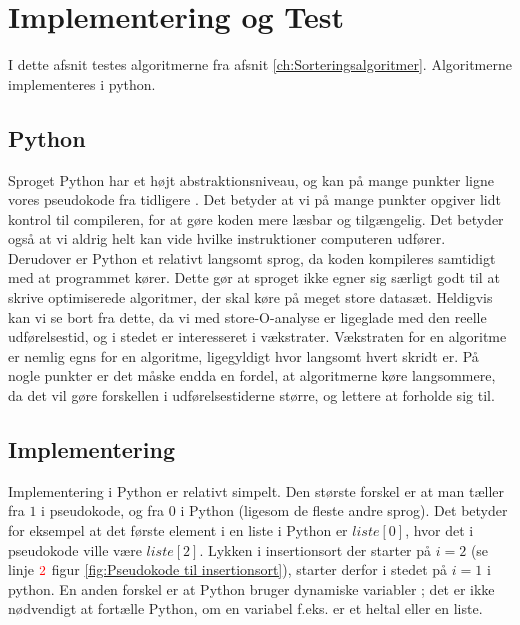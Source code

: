 \chapter{Implementering og Test}
\label{ch:Implementering og test af Algoritmerne}

I dette afsnit testes algoritmerne fra afsnit \ref{ch:Sorteringsalgoritmer}. Algoritmerne implementeres i python.

\section{Python}
\label{sec:Python}

Sproget Python har et højt abstraktionsniveau, og kan på mange punkter ligne vores pseudokode fra tidligere \cite[s. 68]{aogd}. Det betyder at vi på mange punkter opgiver lidt kontrol til compileren, for at gøre koden mere læsbar og tilgængelig. Det betyder også at vi aldrig helt kan vide hvilke instruktioner computeren udfører. Derudover er Python et relativt langsomt sprog, da koden kompileres samtidigt med at programmet kører. Dette gør at sproget ikke egner sig særligt godt til at skrive optimiserede algoritmer, der skal køre på meget store datasæt. Heldigvis kan vi se bort fra dette, da vi med store-O-analyse er ligeglade med den reelle udførelsestid, og i stedet er interesseret i vækstrater. Vækstraten for en algoritme er nemlig egns for en algoritme, ligegyldigt hvor langsomt hvert skridt er. På nogle punkter er det måske endda en fordel, at algoritmerne køre langsommere, da det vil gøre forskellen i udførelsestiderne større, og lettere at forholde sig til. 


\section{Implementering}
\label{sec:Implementering}

Implementering i Python er relativt simpelt. Den største forskel er at man tæller fra $1$ i pseudokode, og fra $0$ i Python (ligesom de fleste andre sprog). Det betyder for eksempel at det første element i en liste i Python er $liste[0]$, hvor det i pseudokode ville være $liste[2]$. Lykken i insertionsort der starter på $i = 2$ (se linje $\color{red}2\color{black}$ figur \ref{fig:Pseudokode til insertionsort}), starter  derfor i stedet på $i = 1$ i python. En anden forskel er at Python bruger dynamiske variabler \cite{what-is-python}; det er ikke nødvendigt at fortælle Python, om en variabel f.eks. er et heltal eller en liste.

